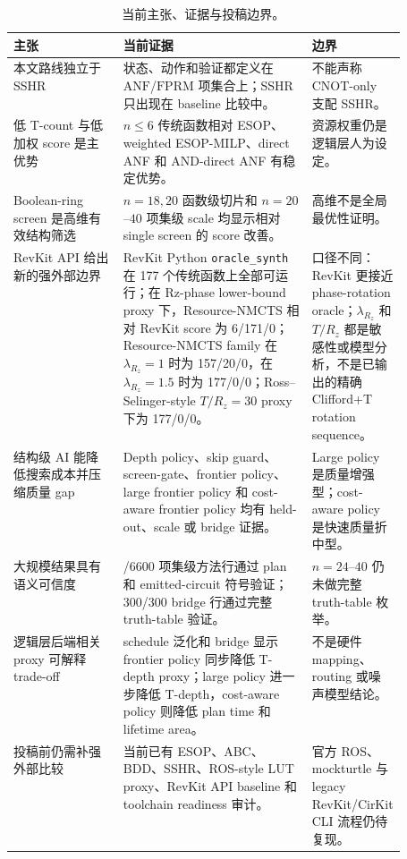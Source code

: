 \documentclass[UTF8,fontset=macnew,11pt]{ctexart}
\newcommand{\method}{Resource-NMCTS}
\newcommand{\screen}{Boolean-ring screen}
\newcommand{\anf}{\ensuremath{\mathrm{ANF}}}
\newcommand{\fprm}{\ensuremath{\mathrm{FPRM}}}
\newcommand{\ttable}{truth-table}
\begin{document}
\begin{table}[H]
\centering
\small
\caption{当前主张、证据与投稿边界。}
\label{tab:evidence-map}
\begin{tabularx}{\linewidth}{>{\raggedright\arraybackslash}p{0.28\linewidth}>{\raggedright\arraybackslash}X>{\raggedright\arraybackslash}p{0.23\linewidth}}
\toprule
主张 & 当前证据 & 边界 \\
\midrule
本文路线独立于 SSHR & 状态、动作和验证都定义在 \anf{}/\fprm{} 项集合上；SSHR 只出现在 baseline 比较中。 & 不能声称 CNOT-only 支配 SSHR。 \\
低 T-count 与低加权 score 是主优势 & $n\leq6$ 传统函数相对 ESOP、weighted ESOP-MILP、direct ANF 和 AND-direct ANF 有稳定优势。 & 资源权重仍是逻辑层人为设定。 \\
\screen{} 是高维有效结构筛选 & $n=18,20$ 函数级切片和 $n=20$--$40$ 项集级 scale 均显示相对 single screen 的 score 改善。 & 高维不是全局最优性证明。 \\
RevKit API 给出新的强外部边界 & RevKit Python \texttt{oracle\_synth} 在 177 个传统函数上全部可运行；在 Rz-phase lower-bound proxy 下，\method{} 相对 RevKit score 为 6/171/0；Resource-NMCTS family 在 $\lambda_{R_z}=1$ 时为 157/20/0，在 $\lambda_{R_z}=1.5$ 时为 177/0/0；Ross--Selinger-style $T/R_z=30$ proxy 下为 177/0/0。 & 口径不同：RevKit 更接近 phase-rotation oracle；$\lambda_{R_z}$ 和 $T/R_z$ 都是敏感性或模型分析，不是已输出的精确 Clifford+T rotation sequence。 \\
结构级 AI 能降低搜索成本并压缩质量 gap & Depth policy、skip guard、screen-gate、frontier policy、large frontier policy 和 cost-aware frontier policy 均有 held-out、scale 或 bridge 证据。 & Large policy 是质量增强型；cost-aware policy 是快速质量折中型。 \\
大规模结果具有语义可信度 & 6600/6600 项集级方法行通过 plan 和 emitted-circuit 符号验证；300/300 bridge 行通过完整 \ttable{} 验证。 & $n=24$--$40$ 仍未做完整 \ttable{} 枚举。 \\
逻辑层后端相关 proxy 可解释 trade-off & schedule 泛化和 bridge 显示 frontier policy 同步降低 T-depth proxy；large policy 进一步降低 T-depth，cost-aware policy 则降低 plan time 和 lifetime area。 & 不是硬件 mapping、routing 或噪声模型结论。 \\
投稿前仍需补强外部比较 & 当前已有 ESOP、ABC、BDD、SSHR、ROS-style LUT proxy、RevKit API baseline 和 toolchain readiness 审计。 & 官方 ROS、mockturtle 与 legacy RevKit/CirKit CLI 流程仍待复现。 \\
\bottomrule
\end{tabularx}
\end{table}
\end{document}
